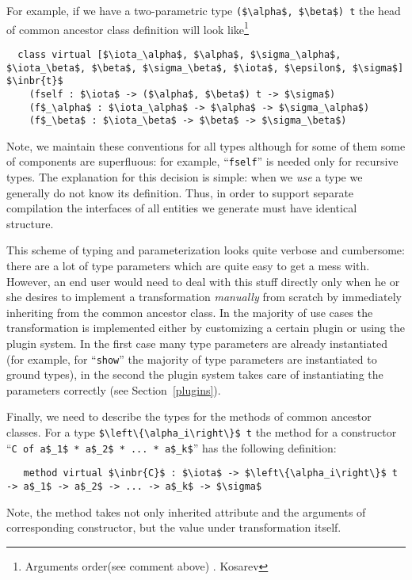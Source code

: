 For example, if we have a two-parametric type \lstinline{($\alpha$, $\beta$) t} the head of common ancestor class definition will look like\footnote{Arguments order(see comment above) . Kosarev}

\begin{lstlisting}
  class virtual [$\iota_\alpha$, $\alpha$, $\sigma_\alpha$, $\iota_\beta$, $\beta$, $\sigma_\beta$, $\iota$, $\epsilon$, $\sigma$] $\inbr{t}$
    (fself : $\iota$ -> ($\alpha$, $\beta$) t -> $\sigma$)
    (f$_\alpha$ : $\iota_\alpha$ -> $\alpha$ -> $\sigma_\alpha$)
    (f$_\beta$ : $\iota_\beta$ -> $\beta$ -> $\sigma_\beta$)
\end{lstlisting}

Note, we maintain these conventions for all types although for some of them some of components are superfluous: for example, ``\lstinline{fself}''
is needed only for recursive types. The explanation for this decision is simple: when we \emph{use} a type we generally do not know its
definition. Thus, in order to support separate compilation the interfaces of all entities we generate must have identical structure.

This scheme of typing and parameterization looks quite verbose and cumbersome: there are a lot of type parameters which are quite easy to get a mess with. However, an end
user would need to deal with this stuff directly only when he or she desires to implement a transformation \emph{manually} from scratch by immediately inheriting from the common ancestor class.
In the majority of use cases the transformation is implemented either by customizing a certain plugin or using the plugin system. In the first case many
type parameters are already instantiated (for example, for ``\lstinline{show}'' the majority of type parameters are instantiated to ground types), in the
second the plugin system takes care of instantiating the parameters correctly (see Section~\ref{plugins}).

Finally, we need to describe the types for the methods of common ancestor classes. For a type \lstinline|$\left\{\alpha_i\right\}$ t| the method for a
 constructor ``\lstinline|C of a$_1$ * a$_2$ * ... * a$_k$|'' has the following definition:

\begin{lstlisting}
   method virtual $\inbr{C}$ : $\iota$ -> $\left\{\alpha_i\right\}$ t -> a$_1$ -> a$_2$ -> ... -> a$_k$ -> $\sigma$
\end{lstlisting}

Note, the method takes not only inherited attribute and the arguments of corresponding constructor, but the value under transformation itself.

